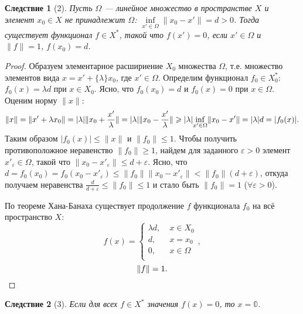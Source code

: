 \documentclass[12pt,a4paper,titlepage,oneside]{book}
\theoremstyle{definition}
\theoremstyle{plain}
\theoremstyle{break}
\theoremstyle{remark}
\theoremstyle{remark}
\theoremstyle{remark}
\theoremstyle{remark}
\theoremstyle{plain}
\theoremstyle{plain}
\newtheorem*{corollary}{Следствие}
\begin{document}
\begin{corollary}[2]
Пусть $\Omega$ --- линейное множество в пространстве $X$ и элемент $x_0 \in X$ не принадлежит $\Omega$: $\inf \limits_{x' \in \Omega} \lVert x_0-x' \rVert = d>0$. Тогда существует функционал $f \in X^*$, такой что $f(x')=0$, если $x' \in \Omega$ и $\lVert f \rVert = 1$, $f(x_0)=d$.
\end{corollary}
\begin{proof}
Образуем элементарное расшириение $X_0$ множества $\Omega$, т.е. множество элементов вида $x=x'+\{ \lambda \}x_0$, где $x' \in \Omega$. Определим функционал $f_0 \in X^*_0$: $f_0(x)=\lambda d$ при $x \in X_0$. Ясно, что $f_0(x_0)=d$ и $f_0(x)=0$ при $x \in \Omega$. Оценим норму $\lVert x \rVert$:
\begin{equation*}
\lVert x\rVert=\lVert x'+\lambda x_0\rVert=| \lambda | \lVert x_0+\frac{x'}{\lambda}\rVert=|\lambda |\lVert x_0-\frac{x'}{\lambda}\rVert \geqslant | \lambda | \smash{\displaystyle \inf_{x' \in \Omega}}\lVert x_0-x' \rVert=| \lambda |d=|f_0(x)|.
\end{equation*}
Таким образом $|f_0(x)|\leqslant \lVert x \rVert$ и $\lVert f_0 \rVert \leqslant 1$.
Чтобы получить противоположное неравенство $\lVert f_0 \rVert \geqslant 1$, найдем для заданного $\varepsilon > 0$ элемент $x'_{\varepsilon}\in \Omega$, такой что $\lVert x_0-x'_{\varepsilon} \rVert \leqslant d+\varepsilon$. Ясно, что $d=f_0(x_0)=f_0(x_0-x'_{\varepsilon})\leqslant \lVert f_0\rVert\lVert x_0-x'_{\varepsilon} \rVert < \lVert f_0\rVert (d+\varepsilon)$, откуда получаем неравенства $\frac{d}{d+\varepsilon}\leqslant \lVert f_0\rVert \leqslant 1$ и стало быть $\lVert f_0\rVert=1$ ($\forall \varepsilon > 0$).

По теореме Хана-Банаха существует продолжение $f$ функционала $f_0$ на всё пространство $X$:
\begin{equation*}
f(x) =
\begin{cases}
\lambda d, \; &x \in X_0\\
d, \; &x = x_0\\
0, \; &x \in \Omega\\
\end{cases},
\end{equation*}
\begin{equation*}
\lVert f \rVert=1.
\qedhere
\end{equation*}
\end{proof}

\begin{corollary}[3]
Если для всех $f \in X^*$ значения $f(x)=0$, то $x=\mathbb{0}$.
\end{corollary}
\end{document}
